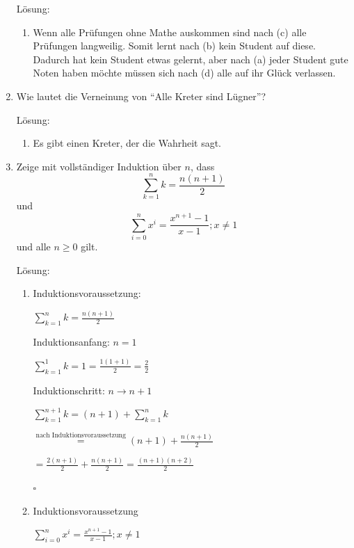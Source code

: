 \documentclass[main.tex]{subfiles}
\begin{document}
\begin{enumerate}
	      Lösung:
	      \begin{enumerate}
		      \item Wenn alle Prüfungen ohne Mathe auskommen sind nach (c) alle Prüfungen langweilig.
		            Somit lernt nach (b) kein Student auf diese. Dadurch hat kein Student etwas gelernt, aber nach
		            (a) jeder Student gute Noten haben möchte müssen sich nach (d) alle auf ihr Glück verlassen.
	      \end{enumerate}
	\item Wie lautet die Verneinung von "`Alle Kreter sind Lügner"'?

	      Lösung:
	      \begin{enumerate}
		      \item Es gibt einen Kreter, der die Wahrheit sagt.
	      \end{enumerate}
	\item Zeige mit vollständiger Induktion über \( n \), dass
	      \[  \sum_{k = 1}^{n} k = \frac{n(n + 1)}{2} \]
	      und
	      \[  \sum_{i = 0}^{n} x^i = \frac{x^{n + 1} - 1}{ x - 1 };  x \neq 1\]
	      und alle \( n \geq 0 \) gilt.

	      Lösung:
	      \begin{enumerate}
		      \item Induktionsvoraussetzung:

		            \(  \sum_{k = 1}^{n} k = \frac{n(n + 1)}{2} \)
		            \vspace{10pt}

		            Induktionsanfang: \( n = 1 \)

		            \(  \sum_{k = 1}^{1} k = 1 =  \frac{1(1 + 1)}{2} = \frac{2}{2} \)
		            \vspace{10pt}

		            Induktionschritt: \( n \rightarrow  n + 1 \)

		            \(  \sum_{k = 1}^{n + 1} k = (n + 1) + \sum_{k = 1}^{n} k  \)

		            \( \stackrel{\text{nach Induktionsvoraussetzung}}{=}
		            (n + 1) + \frac{n (n +1)}{2} \)

		            \(  = \frac{ 2(n + 1) }{2} + \frac{n (n +1)}{2}
		            = \frac{(n + 1)(n + 2)}{2}  \)

		            \( \square \)
		      \item Induktionsvoraussetzung

		            \( \sum_{i = 0}^{n} x^i = \frac{x^{n + 1} - 1}{ x - 1 };  x \neq 1 \)
		            \vspace{10pt}


\end{enumerate}
\end{enumerate}
\end{document}

